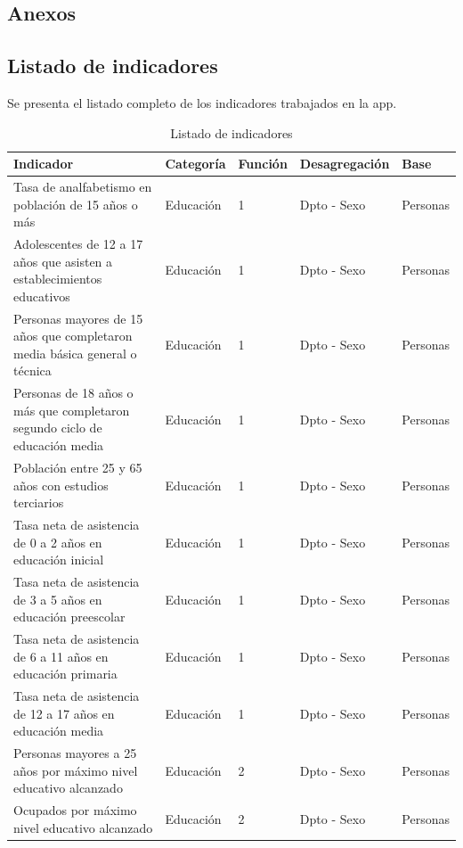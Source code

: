 \documentclass[12pt,twoside,spanish,a4paper]{book}\usepackage[]{graphicx}\usepackage[]{color}
\begin{document}
\begin{appendix}

\chapter{Anexos} 

\section{Listado de indicadores \label{ane:ind}}

Se presenta el listado completo de los indicadores trabajados en la app.

\begin{longtable}{p{2in}|p{1in}|p{0.5in}|p{1in}|p{0.5in}}
\caption{Listado de indicadores} \\ 
  \hline
Indicador & Categoría & Función & Desagregación & Base \\ 
  \hline
Tasa de analfabetismo en población de 15 años o más & Educación & 1 & Dpto - Sexo  & Personas \\ 
  Adolescentes de 12 a 17 años que asisten a establecimientos educativos & Educación & 1 & Dpto - Sexo  & Personas \\ 
  Personas mayores de 15 años que completaron media básica general o técnica & Educación & 1 & Dpto - Sexo  & Personas \\ 
  Personas de 18 años o más que completaron segundo ciclo de educación media & Educación & 1 & Dpto - Sexo  & Personas \\ 
  Población entre 25 y 65 años con estudios terciarios & Educación & 1 & Dpto - Sexo  & Personas \\ 
  Tasa neta de asistencia de 0 a 2 años en educación inicial & Educación & 1 & Dpto - Sexo  & Personas \\ 
  Tasa neta de asistencia de 3 a 5 años en educación preescolar & Educación & 1 & Dpto - Sexo  & Personas \\ 
  Tasa neta de asistencia de 6 a 11 años en educación primaria & Educación & 1 & Dpto - Sexo  & Personas \\ 
  Tasa neta de asistencia de 12 a 17 años en educación media & Educación & 1 & Dpto - Sexo  & Personas \\ 
  Personas mayores a 25 años por máximo nivel educativo alcanzado & Educación & 2 & Dpto - Sexo  & Personas \\ 
  Ocupados por máximo nivel educativo alcanzado & Educación & 2 & Dpto - Sexo & Personas \\ 

\end{longtable}
\end{appendix}
\end{document}
